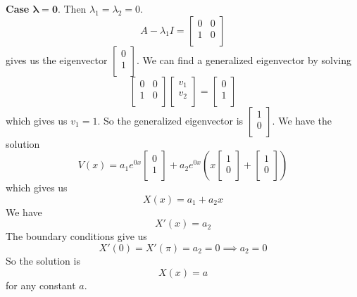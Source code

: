 \documentclass[plain]{pset}
\begin{document}
\begin{solution}
    \textbf{Case \(\mathbf{\lambda = 0}\)}. Then \(\lambda_1 = \lambda_2 = 0\).
    \[A - \lambda_1I = \begin{bmatrix}
            0 & 0 \\
            1 & 0 \\
        \end{bmatrix}
    \]
    gives us the eigenvector \(\begin{bmatrix}
        0 \\
        1 \\
    \end{bmatrix}\). We can find a generalized eigenvector by solving
    \[
        \begin{bmatrix}
            0 & 0 \\
            1 & 0 \\
        \end{bmatrix}\begin{bmatrix}
            v_1 \\
            v_2 \\
        \end{bmatrix} = \begin{bmatrix}
            0 \\
            1 \\
        \end{bmatrix}
    \]
    which gives us \(v_1 = 1\). So the generalized eigenvector is \(\begin{bmatrix}
        1 \\
        0 \\
    \end{bmatrix}\).
    We have the solution
    \[V(x) = a_1 e^{0x}\begin{bmatrix}
            0 \\
            1 \\
        \end{bmatrix} + a_2 e^{0x}\left(x\begin{bmatrix}
                1 \\
                0 \\
            \end{bmatrix} + \begin{bmatrix}
                1 \\
                0 \\
            \end{bmatrix}\right)\]
    which gives us
    \[X(x) = a_1 + a_2x\]
    We have
    \[X'(x) = a_2\]
    The boundary conditions give us
    \[X'(0) = X'(\pi) = a_2 = 0 \implies a_2 = 0\]
    So the solution is
    \[X(x) = a\] for any constant \(a\).


\end{solution}
\end{document}
